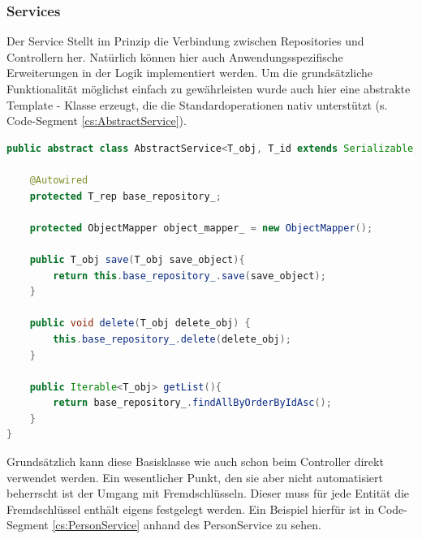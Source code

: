 \subsubsection{Services}
Der Service Stellt im Prinzip die Verbindung zwischen Repositories und Controllern her. Natürlich können hier auch Anwendungsspezifische Erweiterungen in der Logik implementiert werden. Um die grundsätzliche Funktionalität möglichst einfach zu gewährleisten wurde auch hier eine abstrakte Template - Klasse erzeugt, die die Standardoperationen nativ unterstützt (s. Code-Segment \ref{cs:AbstractService}).

\scriptsize
\begin{lstlisting}[caption=AbstractService.java, label=cs:AbstractService, language=Java]
public abstract class AbstractService<T_obj, T_id extends Serializable, T_rep extends AbstractRepository<T_obj, T_id>> implements AbstractServiceInterface<T_obj>{

	@Autowired
	protected T_rep base_repository_;
	
	protected ObjectMapper object_mapper_ = new ObjectMapper();
	
	public T_obj save(T_obj save_object){
		return this.base_repository_.save(save_object);
	}
	
	public void delete(T_obj delete_obj) { 
		this.base_repository_.delete(delete_obj);
	}
	
	public Iterable<T_obj> getList(){
		return base_repository_.findAllByOrderByIdAsc();
	}
}
\end{lstlisting}
\normalsize

Grundsätzlich kann diese Basisklasse wie auch schon beim Controller direkt verwendet werden. Ein wesentlicher Punkt, den sie aber nicht automatisiert beherrscht ist der Umgang mit Fremdschlüsseln. Dieser muss für jede Entität die Fremdschlüssel enthält eigens festgelegt werden. Ein Beispiel hierfür ist in Code-Segment \ref{cs:PersonService} anhand des PersonService zu sehen.

